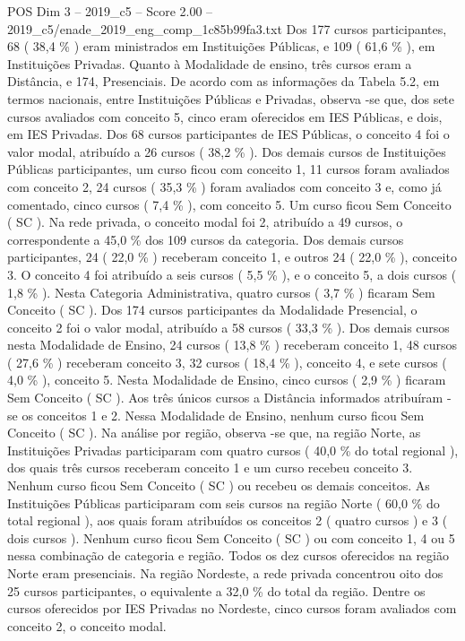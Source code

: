 \begin{textsample}{POS Dim 3 – 2019\_c5 – Score 2.00 – 2019\_c5/enade\_2019\_eng\_comp\_1c85b99fa3.txt}
Dos 177 cursos participantes, 68 ( 38,4 \% ) eram ministrados em Instituições Públicas, e 109 ( 61,6 \% ), em Instituições Privadas.
Quanto à Modalidade de ensino, três cursos eram a Distância, e 174, Presenciais.
De acordo com as informações da Tabela 5.2, em termos nacionais, entre Instituições Públicas e Privadas, observa -se que, dos sete cursos avaliados com conceito 5, cinco eram oferecidos em IES Públicas, e dois, em IES Privadas.
Dos 68 cursos participantes de IES Públicas, o conceito 4 foi o valor modal, atribuído a 26 cursos ( 38,2 \% ).
Dos demais cursos de Instituições Públicas participantes, um curso ficou com conceito 1, 11 cursos foram avaliados com conceito 2, 24 cursos ( 35,3 \% ) foram avaliados com conceito 3 e, como já comentado, cinco cursos ( 7,4 \% ), com conceito 5.
Um curso ficou Sem Conceito ( SC ).
Na rede privada, o conceito modal foi 2, atribuído a 49 cursos, o correspondente a 45,0 \% dos 109 cursos da categoria.
Dos demais cursos participantes, 24 ( 22,0 \% ) receberam conceito 1, e outros 24 ( 22,0 \% ), conceito 3.
O conceito 4 foi atribuído a seis cursos ( 5,5 \% ), e o conceito 5, a dois cursos ( 1,8 \% ).
Nesta Categoria Administrativa, quatro cursos ( 3,7 \% ) ficaram Sem Conceito ( SC ).
Dos 174 cursos participantes da Modalidade Presencial, o conceito 2 foi o valor modal, atribuído a 58 cursos ( 33,3 \% ).
Dos demais cursos nesta Modalidade de Ensino, 24 cursos ( 13,8 \% ) receberam conceito 1, 48 cursos ( 27,6 \% ) receberam conceito 3, 32 cursos ( 18,4 \% ), conceito 4, e sete cursos ( 4,0 \% ), conceito 5.
Nesta Modalidade de Ensino, cinco cursos ( 2,9 \% ) ficaram Sem Conceito ( SC ).
Aos três únicos cursos a Distância informados atribuíram -se os conceitos 1 e 2.
Nessa Modalidade de Ensino, nenhum curso ficou Sem Conceito ( SC ).
Na análise por região, observa -se que, na região Norte, as Instituições Privadas participaram com quatro cursos ( 40,0 \% do total regional ), dos quais três cursos receberam conceito 1 e um curso recebeu conceito 3.
Nenhum curso ficou Sem Conceito ( SC ) ou recebeu os demais conceitos.
As Instituições Públicas participaram com seis cursos na região Norte ( 60,0 \% do total regional ), aos quais foram atribuídos os conceitos 2 ( quatro cursos ) e 3 ( dois cursos ).
Nenhum curso ficou Sem Conceito ( SC ) ou com conceito 1, 4 ou 5 nessa combinação de categoria e região.
Todos os dez cursos oferecidos na região Norte eram presenciais.
Na região Nordeste, a rede privada concentrou oito dos 25 cursos participantes, o equivalente a 32,0 \% do total da região.
Dentre os cursos oferecidos por IES Privadas no Nordeste, cinco cursos foram avaliados com conceito 2, o conceito modal.

\end{textsample}
